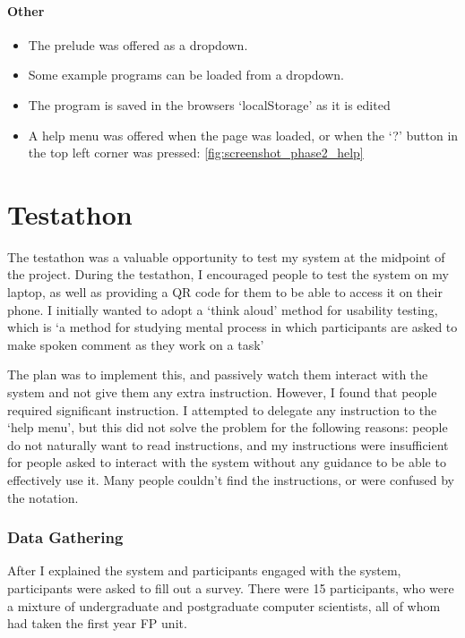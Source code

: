 \paragraph{Other}

\begin{itemize}
    \item The prelude was offered as a dropdown.
    \item Some example programs can be loaded from a dropdown.  
    \item The program is saved in the browsers `localStorage' as it is edited
    \item A help menu was offered when the page was loaded, or when the `?' button in the top left corner was pressed: \ref{fig:screenshot_phase2_help}
\end{itemize}

\section{Testathon}
The testathon was a valuable opportunity to test my system at the midpoint of the project. During the testathon, I encouraged people to test the system on my laptop, as well as providing a QR code for them to be able to access it on their phone. I initially wanted to adopt a `think aloud' method for usability testing, which is `a method for studying mental process in which participants are asked to make spoken comment as they work on a task'\cite{thinkaloud}

The plan was to implement this, and passively watch them interact with the system and not give them any extra instruction. However, I found that people required significant instruction. I attempted to delegate any instruction to the `help menu', but this did not solve the problem for the following reasons: people do not naturally want to read instructions, and my instructions were insufficient for people asked to interact with the system without any guidance to be able to effectively use it. Many people couldn't find the instructions, or were confused by the notation.

\subsubsection{Data Gathering}
After I explained the system and participants engaged with the system, participants were asked to fill out a survey. There were 15 participants, who were a mixture of undergraduate and postgraduate computer scientists, all of whom had taken the first year \ac{FP} unit. 

